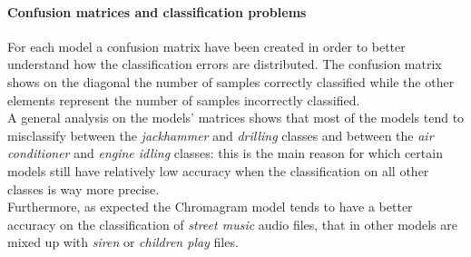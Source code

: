 \documentclass[oneside,openany]{article}
\begin{document}
    \paragraph{Confusion matrices and classification problems}
    For each model a confusion matrix have been created in order to better understand how the classification errors are distributed. The confusion matrix shows on the diagonal the number of samples correctly classified while the other elements represent the number of samples incorrectly classified.\\
    A general analysis on the models' matrices shows that most of the models tend to misclassify between the \textit{jackhammer} and \textit{drilling} classes and between the \textit{air conditioner} and \textit{engine idling} classes: this is the main reason for which certain models still have relatively low accuracy when the classification on all other classes is way more precise.\\
    Furthermore, as expected the Chromagram model tends to have a better accuracy on the classification of \textit{street music} audio files, that in other models are mixed up with \textit{siren} or \textit{children play} files.
    
    \newpage
    
\end{document}
